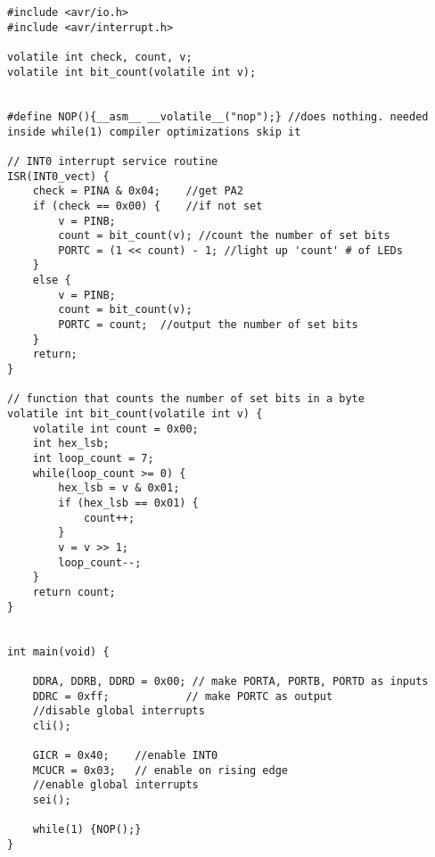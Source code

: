 \documentclass[11pt]{article}
\begin{document}
\begin{verbatim}


#include <avr/io.h>
#include <avr/interrupt.h>

volatile int check, count, v;
volatile int bit_count(volatile int v);


#define NOP(){__asm__ __volatile__("nop");} //does nothing. needed inside while(1) compiler optimizations skip it

// INT0 interrupt service routine
ISR(INT0_vect) {
	check = PINA & 0x04;	//get PA2
	if (check == 0x00) {	//if not set
		v = PINB;
		count = bit_count(v); //count the number of set bits
		PORTC = (1 << count) - 1; //light up 'count' # of LEDs
	}
	else {
		v = PINB;
		count = bit_count(v);
		PORTC = count;	//output the number of set bits
	}
	return;
}

// function that counts the number of set bits in a byte
volatile int bit_count(volatile int v) {
	volatile int count = 0x00;
	int hex_lsb;
	int loop_count = 7;
	while(loop_count >= 0) {
		hex_lsb = v & 0x01;
		if (hex_lsb == 0x01) {
			count++;
		}
		v = v >> 1;
		loop_count--;
	}
	return count;
}


int main(void) {
	
	DDRA, DDRB, DDRD = 0x00; // make PORTA, PORTB, PORTD as inputs
	DDRC = 0xff;			// make PORTC as output
	//disable global interrupts
	cli();
	
	GICR = 0x40;	//enable INT0
	MCUCR = 0x03;	// enable on rising edge
	//enable global interrupts
	sei();
	
	while(1) {NOP();}
}

\end{verbatim}
\end{document}
